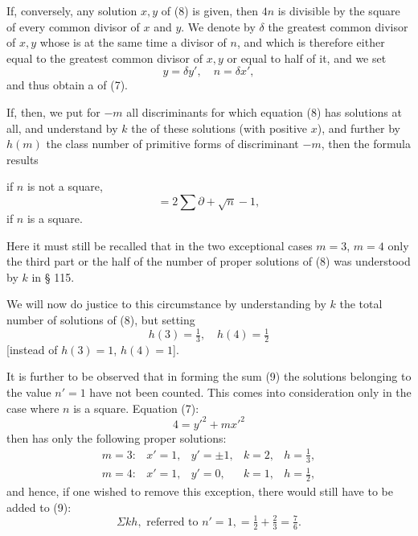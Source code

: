 If, conversely, any solution $x, y$ of (8) is given, then $4n$ is
divisible by the square of every common divisor of $x$ and $y$. We
denote by $\delta$ the greatest common divisor of $x, y$ whose  is
at the same time a divisor of $n$, and which is therefore either equal
to the greatest common divisor of $x, y$ or equal to half of it, and we
set
\[
y = \delta y', \quad n = \delta x', %
\]
and thus obtain a  of (7).

If, then, we put for $-m$ all discriminants for which equation (8) has
solutions at all, and understand by $k$ the  of these solutions
(with positive $x$), and further by $h(m)$ the class number of primitive
forms of discriminant $-m$, then the formula results

if $n$ is not a square,
\[
= 2\sum \partial + \sqrt{n} - 1,
\]
if $n$ is a square.

Here it must still be recalled that in the two exceptional cases $m=3$,
$m=4$ only the third part or the half of the number of proper solutions
of (8) was understood by $k$ in § 115.

We will now do justice to this circumstance by understanding by $k$ the
total number of solutions of (8), but setting
\[
h(3) = \tfrac{1}{3}, \quad h(4) = \tfrac{1}{2}
\]
[instead of $h(3)=1$, $h(4)=1$].

It is further to be observed that in forming the sum (9) the solutions
belonging to the value $n'=1$ have not been counted. This comes into
consideration only in the case where $n$ is a square. Equation (7):
\[
4 = y'^2 + m x'^2
\]
then has only the following proper solutions:
\[
\begin{array}{lllll}
m=3: & x'=1, & y'=\pm 1, & k=2, & h=\tfrac{1}{3},\\
m=4: & x'=1, & y'=0, & k=1, & h=\tfrac{1}{2},
\end{array}
\]
and hence, if one wished to remove this exception, there would still
have to be added to (9):
\[
\Sigma k h, \text{ referred to } n'=1, = \tfrac{1}{2}+\tfrac{2}{3} = \tfrac{7}{6}.
\]
